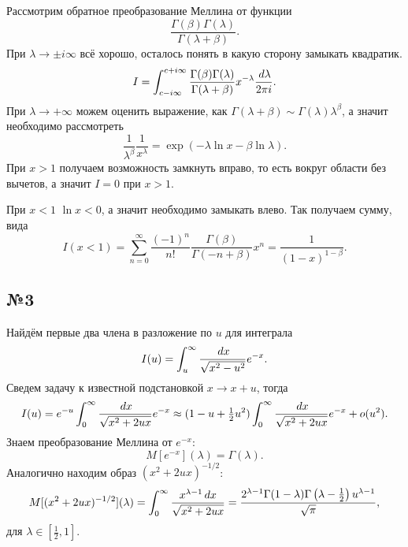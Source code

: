 Рассмотрим обратное преобразование Меллина от функции 
\begin{equation*}
	\frac{\Gamma(\beta) \Gamma(\lambda)}{\Gamma(\lambda + \beta)}.
\end{equation*}
При $\lambda \to \pm i\infty$ всё хорошо, осталось понять в какую сторону замыкать квадратик.
\begin{equation*}
	I = \int_{c - i \infty}^{c + i \infty} \frac{\Gamma(\beta) \Gamma(\lambda)}{\Gamma(\lambda + \beta)} x^{-\lambda} \frac{\, d \lambda}{2 \pi i}.
\end{equation*}
При $\lambda \to  + \infty$ можем оценить выражение, как $\Gamma(\lambda + \beta) \sim \Gamma(\lambda) \lambda^\beta$, а значит необходимо рассмотреть 
\begin{equation*}
	\frac{1}{\lambda^\beta} \frac{1}{x^\lambda} = \exp\left(
		- \lambda \ln x - \beta \ln \lambda
	\right).
\end{equation*}
При $x > 1$ получаем возможность замкнуть вправо, то есть вокруг области без вычетов, а значит $I = 0$ при $x > 1$. 

При $x < 1$ $\ln x < 0$, а значит необходимо замыкать влево. Так получаем сумму, вида
\begin{equation*}
	I(x < 1) = \sum_{n=0}^{\infty} \frac{(-1)^n}{n!} \frac{\Gamma(\beta)}{\Gamma(-n + \beta)} x^{n} = \frac{1}{(1  -x)^{1-\beta}}.
\end{equation*}

\subsection*{№3}

Найдём первые два члена в разложение по $u$ для интеграла
\begin{equation*}
	I(u) = \int_{u}^{\infty} \frac{\, d x}{\sqrt{x^2 - u^2}} e^{-x}.
\end{equation*}
Сведем задачу к известной подстановкой $x \to x + u$, тогда
\begin{equation*}
	I(u) = e^{-u} \int_{0}^{\infty} \frac{\, d x}{\sqrt{x^2 + 2 u x}} e^{-x} \approx (1 - u + \tfrac{1}{2} u^2)\int_{0}^{\infty} \frac{\, d x}{\sqrt{x^2 + 2 u x}} e^{-x} + o(u^2).
\end{equation*}
Знаем преобразование Меллина от $e^{-x}$:
\begin{equation*}
	M[e^{-x}](\lambda) = \Gamma(\lambda).
\end{equation*}
Аналогично находим образ $(x^2 + 2 u x)^{-1/2}$:
\begin{equation*}
	M[(x^2 + 2 u x)^{-1/2}](\lambda) = \int_{0}^{\infty} 
	\frac{x^{\lambda-1}\, d x}{\sqrt{x^2 + 2 u x}}
	= \frac{2^{\lambda -1} \Gamma (1-\lambda ) \Gamma \left(\lambda -\frac{1}{2}\right) u^{\lambda -1}}{\sqrt{\pi }},
\end{equation*}
для $\lambda \in [\tfrac{1}{2}, 1]$.

